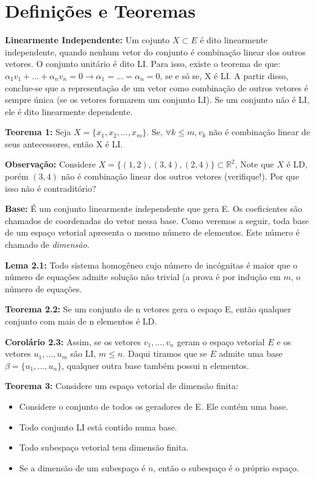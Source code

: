 \documentclass[12pt,letterpaper]{article}
\begin{document}
\section*{Definições e Teoremas}

\textbf{Linearmente Independente: } Um cojunto $X \subset E$ é dito linearmente independente, quando nenhum vetor do conjunto é combinação linear dos outros vetores. O conjunto unitário é dito LI. Para isso, existe o teorema de que: $\alpha_1v_1 + ... + \alpha_nv_n = 0 \to \alpha_1 = ... = \alpha_n = 0$, se e só se, X é LI. A partir disso, conclue-se que a representação de um vetor como combinação de outros vetores é sempre única (se os vetores formarem um conjunto LI). Se um conjunto não é LI, ele é dito linearmente dependente.

\textbf{Teorema 1: } Seja $X = \{x_1,x_2,...,x_m\}$. Se, $\forall k \leq m, v_k$ não é combinação linear de seus antecessores, então X é LI. 

\textbf{Observação: } Considere $X = \{(1,2),(3,4),(2,4)\} \subset \mathbb{R}^2$, Note que $X$ é LD, porém $(3,4)$ não é combinação linear dos outros vetores (verifique!). Por que isso não é contraditório?

\textbf{Base: } É um conjunto linearmente independente que gera E. Os coeficientes são chamados de coordenadas do vetor nessa base. Como veremos a seguir, toda base de um espaço vetorial apresenta o mesmo número de elementos. Este número é chamado de \textit{dimensão}. 

\textbf{Lema 2.1: } Todo sistema homogêneo cujo número de incógnitas é maior que o número de equações admite solução não trivial (a prova é por indução em $m$, o número de equações. 

\textbf{Teorema 2.2: } Se um conjunto de n vetores gera o espaço E, então qualquer conjunto com mais de n elementos é LD.

\textbf{Corolário 2.3: } Assim, se os vetores $v_1,...,v_n$ geram o espaço vetorial $E$ e os vetores $u_1,...,u_m$ são LI, $m\leq n$. Daqui tiramos que se $E$ admite uma base $\beta = \{u_1,...,u_n\}$, qualquer outra base também possui n elementos.

\textbf{Teorema 3: } Considere um espaço vetorial de dimensão finita:
\begin{itemize}
    \item Considere o conjunto de todos os geradores de E. Ele contém uma base.
    \item Todo conjunto LI está contido numa base.
    \item Todo subespaço vetorial tem dimensão finita. 
    \item Se a dimensão de um subespaço é $n$, então o subespaço é o próprio espaço. 
\end{itemize}
\end{document}

